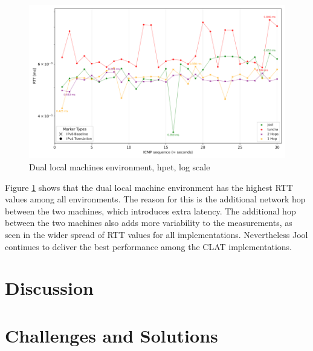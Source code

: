 \begin{figure}[H]
    \centering
    \includegraphics[width=1\textwidth]{resources/plots/CombinedPlot/RTT/Double_ping_rtt_Ping_30s_log.png}
    \caption{Dual local machines environment, hpet, log scale}
    \label{fig:Dual_icmp_sameScale_hpet_log}
\end{figure}

Figure \ref{fig:Dual_icmp_sameScale_hpet_log} shows that the dual local machine environment has the highest RTT values among all environments.
The reason for this is the additional network hop between the two machines, which introduces extra latency.
The additional hop between the two machines also adds more variability to the measurements, as seen in the wider spread of RTT values for all implementations.
Nevertheless Jool continues to deliver the best performance among the CLAT implementations. 


\section{Discussion}

\section{Challenges and Solutions}